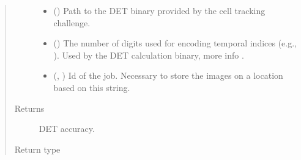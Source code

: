 \documentclass[letterpaper,10pt,english]{sphinxmanual}
\begin{document}
\begin{fulllineitems}
\begin{quote}
\begin{description}
\begin{itemize}
\item {} 
 () \textendash{} Path to the DET binary provided by the cell tracking challenge.

\item {} 
 () \textendash{} The number of digits used for encoding temporal indices (e.g., ). Used by the DET calculation binary,
more info .

\item {} 
 (, ) \textendash{} Id of the job. Necessary to store the images on a location based on this string.

\end{itemize}

\item[{Returns}] \leavevmode
{} \textendash{} DET accuracy.

\item[{Return type}] \leavevmode
{}

\end{description}\end{quote}

\end{fulllineitems}

\end{document}
